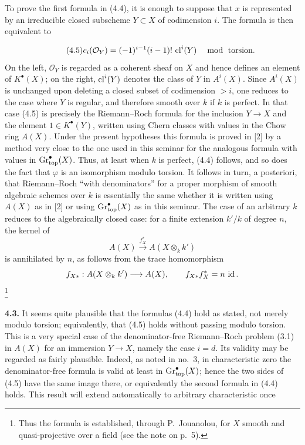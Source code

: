 To prove the first formula in (4.4), it is enough to suppose that $x$ is
represented by an irreducible closed subscheme $Y\subset X$ of codimension
$i$. The formula is then equivalent to

\begin{equation}\tag{4.5}
 c_i(\mathcal O_Y)=(-1)^{i-1}(i-1)!\,\operatorname{cl}^i(Y)
   \quad\bmod\text{ torsion}.
\end{equation}
On the left, $\mathcal O_Y$ is regarded as a coherent sheaf on $X$ and
hence defines an element of $K^\bullet(X)$; on the right,
$\operatorname{cl}^i(Y)$ denotes the class of $Y$ in $A^i(X)$. Since $A^i(X)$ is
unchanged upon deleting a closed subset of codimension $>i$, one reduces
to the case where $Y$ is regular, and therefore smooth over $k$ if $k$ is
perfect. In that case (4.5) is precisely the Riemann--Roch formula for the
inclusion $Y\to X$ and the element $1\in K^\bullet(Y)$, written using
Chern classes with values in the Chow ring $A(X)$. Under the present
hypotheses this formula is proved in [2] by a method very close to the one
used in this seminar for the analogous formula with values in
$\operatorname{Gr}_{\mathrm{top}}^\bullet(X)$. Thus, at least when $k$ is perfect, (4.4) follows, and
so does the fact that $\varphi$ is an isomorphism modulo torsion. It follows
in turn, a posteriori, that Riemann--Roch ``with denominators'' for a proper
morphism of smooth algebraic schemes over $k$ is essentially the same
whether it is written using $A(X)$ as in [2] or using $\operatorname{Gr}_{\mathrm{top}}^\bullet(X)$ as
in this seminar. The case of an arbitrary $k$ reduces to the algebraically
closed case: for a finite extension $k'/k$ of degree $n$, the kernel of
\[
 A(X)\xrightarrow{f_X^*}A(X\otimes_k k')
\]
is annihilated by $n$, as follows from the trace homomorphism
\[
 f_{X*}:A(X\otimes_k k')\longrightarrow A(X),
 \qquad f_{X*}f_X^*=n\,\operatorname{id}.
\]
\footnote{Thus the formula is established, through P.~Jouanolou, for $X$
smooth and quasi-projective over a field (see the note on p.~5).}

\textbf{4.3.} It seems quite plausible that the formulas (4.4) hold as
stated, not merely modulo torsion; equivalently, that (4.5) holds without
passing modulo torsion. This is a very special case of the denominator-free
Riemann--Roch problem (3.1) in $A(X)$ for an immersion $Y\to X$, namely
the case $i=d$. Its validity may be regarded as fairly plausible. Indeed,
as noted in no.~3, in characteristic zero the denominator-free formula is
valid at least in $\operatorname{Gr}_{\mathrm{top}}^\bullet(X)$; hence the two sides of (4.5) have the
same image there, or equivalently the second formula in (4.4) holds. This
result will extend automatically to arbitrary characteristic once

